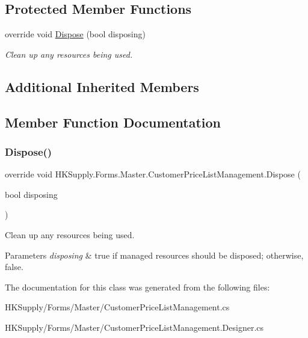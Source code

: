 \subsection*{Protected Member Functions}
\begin{DoxyCompactItemize}
\item 
override void \mbox{\hyperlink{class_h_k_supply_1_1_forms_1_1_master_1_1_customer_price_list_management_ad7c200aa1cd4c346d6a3c6ee8c991d50}{Dispose}} (bool disposing)
\begin{DoxyCompactList}\small\item\em Clean up any resources being used. \end{DoxyCompactList}\end{DoxyCompactItemize}
\subsection*{Additional Inherited Members}


\subsection{Member Function Documentation}
\mbox{\label{class_h_k_supply_1_1_forms_1_1_master_1_1_customer_price_list_management_ad7c200aa1cd4c346d6a3c6ee8c991d50}} 
\subsubsection{\texorpdfstring{Dispose()}{Dispose()}}
{\footnotesize\ttfamily override void H\+K\+Supply.\+Forms.\+Master.\+Customer\+Price\+List\+Management.\+Dispose (\begin{DoxyParamCaption}\item[{bool}]{disposing }\end{DoxyParamCaption})\hspace{0.3cm}{\ttfamily [protected]}}



Clean up any resources being used. 


\begin{DoxyParams}{Parameters}
{\em disposing} & true if managed resources should be disposed; otherwise, false.\\
\hline
\end{DoxyParams}


The documentation for this class was generated from the following files\+:\begin{DoxyCompactItemize}
\item 
H\+K\+Supply/\+Forms/\+Master/Customer\+Price\+List\+Management.\+cs\item 
H\+K\+Supply/\+Forms/\+Master/Customer\+Price\+List\+Management.\+Designer.\+cs\end{DoxyCompactItemize}
